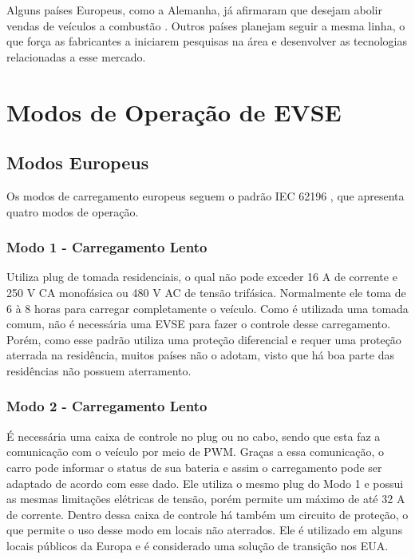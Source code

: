     Alguns países Europeus, como a Alemanha, já afirmaram que desejam abolir vendas de veículos a combustão \cite{forbes-news-germany}. Outros países planejam seguir a mesma linha, o que força as fabricantes a iniciarem pesquisas na área e desenvolver as tecnologias relacionadas a esse mercado.

  \section{Modos de Operação de \ac{EVSE}}

    \subsection{Modos Europeus}

      Os modos de carregamento europeus seguem o padrão IEC 62196 \cite{iec-62196}, que apresenta quatro modos de operação.

        \subsubsection{Modo 1 - Carregamento Lento}

        Utiliza plug de tomada residenciais, o qual não pode exceder 16 A de corrente e 250 V \ac{CA} monofásica ou 480 V AC de tensão trifásica. Normalmente ele toma de 6 à 8 horas para carregar completamente o veículo. Como é utilizada uma tomada comum, não é necessária uma \ac{EVSE} para fazer o controle desse carregamento. Porém, como esse padrão utiliza uma proteção diferencial e requer uma proteção aterrada na residência, muitos países não o adotam, visto que há boa parte das residências não possuem aterramento.

        \subsubsection{Modo 2 - Carregamento Lento}

        É necessária uma caixa de controle no plug ou no cabo, sendo que esta faz a comunicação com o veículo por meio de \ac{PWM}. Graças a essa comunicação, o carro pode informar o status de sua bateria e assim o carregamento pode ser adaptado de acordo com esse dado. Ele utiliza o mesmo plug do Modo 1 e possui as mesmas limitações elétricas de tensão, porém permite um máximo de até 32 A de corrente. Dentro dessa caixa de controle há também um circuito de proteção, o que permite o uso desse modo em locais não aterrados. Ele é utilizado em alguns locais públicos da Europa e é considerado uma solução de transição nos EUA.

